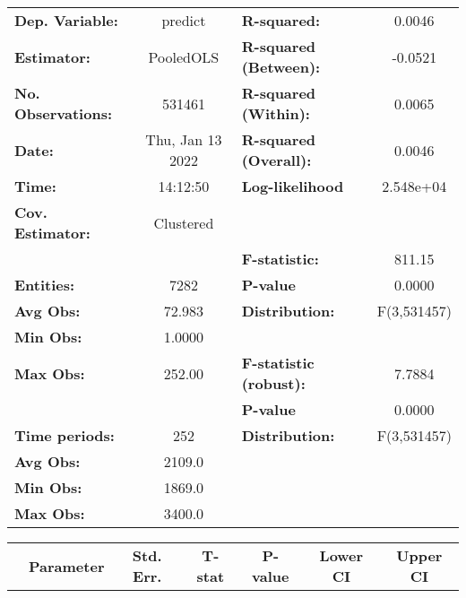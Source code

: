\begin{center}
\begin{tabular}{lclc}
\toprule
\textbf{Dep. Variable:}    &      predict       & \textbf{  R-squared:         }   &      0.0046      \\
\textbf{Estimator:}        &     PooledOLS      & \textbf{  R-squared (Between):}  &     -0.0521      \\
\textbf{No. Observations:} &       531461       & \textbf{  R-squared (Within):}   &      0.0065      \\
\textbf{Date:}             &  Thu, Jan 13 2022  & \textbf{  R-squared (Overall):}  &      0.0046      \\
\textbf{Time:}             &      14:12:50      & \textbf{  Log-likelihood     }   &    2.548e+04     \\
\textbf{Cov. Estimator:}   &     Clustered      & \textbf{                     }   &                  \\
\textbf{}                  &                    & \textbf{  F-statistic:       }   &      811.15      \\
\textbf{Entities:}         &        7282        & \textbf{  P-value            }   &      0.0000      \\
\textbf{Avg Obs:}          &       72.983       & \textbf{  Distribution:      }   &   F(3,531457)    \\
\textbf{Min Obs:}          &       1.0000       & \textbf{                     }   &                  \\
\textbf{Max Obs:}          &       252.00       & \textbf{  F-statistic (robust):} &      7.7884      \\
\textbf{}                  &                    & \textbf{  P-value            }   &      0.0000      \\
\textbf{Time periods:}     &        252         & \textbf{  Distribution:      }   &   F(3,531457)    \\
\textbf{Avg Obs:}          &       2109.0       & \textbf{                     }   &                  \\
\textbf{Min Obs:}          &       1869.0       & \textbf{                     }   &                  \\
\textbf{Max Obs:}          &       3400.0       & \textbf{                     }   &                  \\
\bottomrule
\end{tabular}
\begin{tabular}{lcccccc}
                & \textbf{Parameter} & \textbf{Std. Err.} & \textbf{T-stat} & \textbf{P-value} & \textbf{Lower CI} & \textbf{Upper CI}  \\

\end{tabular}
\end{center}
